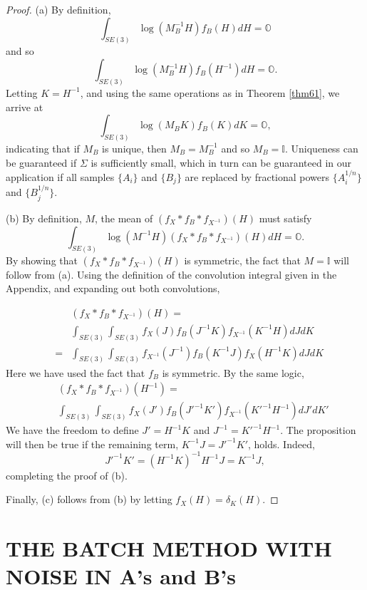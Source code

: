 \documentclass[twocolumn,10pt]{asme2ej}
\begin{document}
\begin{proof}
(a) By definition,
$$ \int_{SE(3)} \log (M_B^{-1} H) f_B(H) dH = \mathbb{O} $$
and so
$$ \int_{SE(3)} \log (M_B^{-1} H) f_B(H^{-1}) dH = \mathbb{O}.$$
Letting $K = H^{-1}$, and using the same operations as in Theorem \ref{thm61}, we arrive at
$$ \int_{SE(3)} \log (M_B K) f_B(K) dK = \mathbb{O}, $$
indicating that if $M_B$ is unique, then $M_B = M_B^{-1}$ and so $M_B = \mathbb{I}$.
Uniqueness can be guaranteed if $\Sigma$ is sufficiently small, which in turn can be guaranteed in our application if all samples $\{A_i\}$ and $\{B_j\}$ are replaced
by fractional powers $\{A_i^{1/n}\}$ and $\{B_j^{1/n}\}$.

(b) By definition, $M$, the mean of $(f_X * f_B* f_{X^{-1}})(H)$ must satisfy
$$ \int_{SE(3)} \log (M^{-1} H) (f_X * f_B* f_{X^{-1}})(H) dH = \mathbb{O}. $$
By showing that $(f_X * f_B* f_{X^{-1}})(H)$ is symmetric, the fact that $M = \mathbb{I}$ will follow from (a).
Using the definition of the convolution integral given in the Appendix, and expanding out both convolutions,

\begin{eqnarray*}
&& (f_X * f_B* f_{X^{-1}})(H) = \\
&& \int_{SE(3)} \int_{SE(3)}
f_X(J) f_B(J^{-1} K) f_{X^{-1}}(K^{-1} H) dJ dK
\\
&=& \int_{SE(3)} \int_{SE(3)} f_{X^{-1}}(J^{-1}) f_B(K^{-1} J) f_{X}(H^{-1} K) dJ dK
\end{eqnarray*}
Here we have used the fact that $f_B$ is symmetric. By the same logic,
\begin{eqnarray*}
&& (f_X * f_B* f_{X^{-1}})(H^{-1}) = \\
&& \int_{SE(3)} \int_{SE(3)}
f_X(J') f_B(J'^{-1} K') f_{X^{-1}}(K'^{-1} H^{-1}) dJ' dK'
\end{eqnarray*}
We have the freedom to define $J'=H^{-1} K$ and $J^{-1} = K'^{-1} H^{-1}$.
The proposition will then be true if the remaining term,
$K^{-1} J = J'^{-1} K'$, holds. Indeed,
$$ J'^{-1} K' = (H^{-1} K)^{-1} H^{-1} J = K^{-1} J, $$
completing the proof of (b).

Finally, (c) follows from (b) by letting $f_X(H) = \delta_K(H)$.
\end{proof}



\section{THE BATCH METHOD WITH NOISE IN A's and B's} \label{batchnoisegen}
\end{document}
